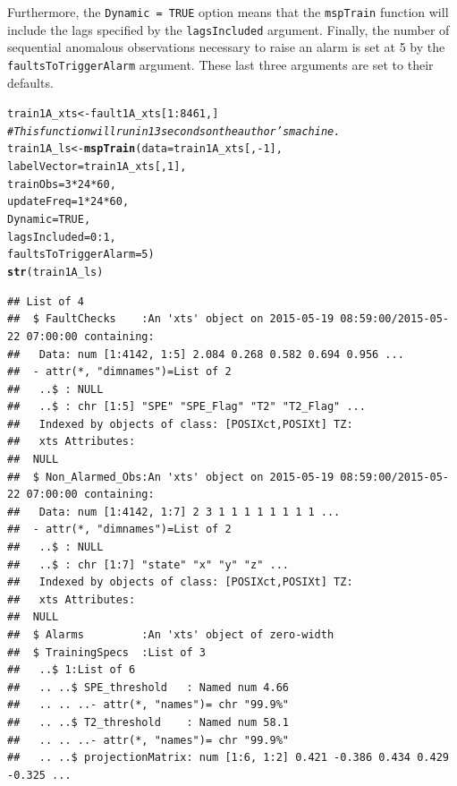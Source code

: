 \documentclass{report}\usepackage[]{graphicx}\usepackage[]{color}
\makeatletter
\newcommand{\hlnum}[1]{\textcolor[rgb]{0.686,0.059,0.569}{#1}}%
\newcommand{\hlcom}[1]{\textcolor[rgb]{0.678,0.584,0.686}{\textit{#1}}}%
\newcommand{\hlopt}[1]{\textcolor[rgb]{0,0,0}{#1}}%
\newcommand{\hlstd}[1]{\textcolor[rgb]{0.345,0.345,0.345}{#1}}%
\newcommand{\hlkwb}[1]{\textcolor[rgb]{0.69,0.353,0.396}{#1}}%
\newcommand{\hlkwc}[1]{\textcolor[rgb]{0.333,0.667,0.333}{#1}}%
\newcommand{\hlkwd}[1]{\textcolor[rgb]{0.737,0.353,0.396}{\textbf{#1}}}%
\newenvironment{kframe}{%
 \def\at@end@of@kframe{}%
 \ifinner\ifhmode%
  \def\at@end@of@kframe{\end{minipage}}%
  \begin{minipage}{\columnwidth}%
 \fi\fi%
 \def\FrameCommand##1{\hskip\@totalleftmargin \hskip-\fboxsep
 \colorbox{shadecolor}{##1}\hskip-\fboxsep
     \hskip-\linewidth \hskip-\@totalleftmargin \hskip\columnwidth}%
 \MakeFramed {\advance\hsize-\width
   \@totalleftmargin\z@ \linewidth\hsize
   \@setminipage}}%
 {\par\unskip\endMakeFramed%
 \at@end@of@kframe}
\newenvironment{knitrout}{}{} %
\makeatother
\begin{document}
Furthermore, the \texttt{Dynamic = TRUE} option means that the \texttt{mspTrain} function will include the lags specified by the \texttt{lagsIncluded} argument. Finally, the number of sequential anomalous observations necessary to raise an alarm is set at 5 by the \texttt{faultsToTriggerAlarm} argument. These last three arguments are set to their defaults.
\begin{knitrout}
\color{fgcolor}\begin{kframe}
\begin{alltt}
\hlstd{train1A_xts} \hlkwb{<-} \hlstd{fault1A_xts[}\hlnum{1}\hlopt{:}\hlnum{8461}\hlstd{,]}
\hlcom{# This function will run in 13 seconds on the author's machine.}
\hlstd{train1A_ls} \hlkwb{<-} \hlkwd{mspTrain}\hlstd{(}\hlkwc{data} \hlstd{= train1A_xts[,}\hlopt{-}\hlnum{1}\hlstd{],}
                       \hlkwc{labelVector} \hlstd{= train1A_xts[,}\hlnum{1}\hlstd{],}
                       \hlkwc{trainObs} \hlstd{=} \hlnum{3} \hlopt{*} \hlnum{24} \hlopt{*} \hlnum{60}\hlstd{,}
                       \hlkwc{updateFreq} \hlstd{=} \hlnum{1} \hlopt{*} \hlnum{24} \hlopt{*} \hlnum{60}\hlstd{,}
                       \hlkwc{Dynamic} \hlstd{=} \hlnum{TRUE}\hlstd{,}
                       \hlkwc{lagsIncluded} \hlstd{=} \hlnum{0}\hlopt{:}\hlnum{1}\hlstd{,}
                       \hlkwc{faultsToTriggerAlarm} \hlstd{=} \hlnum{5}\hlstd{)}
\hlkwd{str}\hlstd{(train1A_ls)}
\end{alltt}
\begin{verbatim}
## List of 4
##  $ FaultChecks    :An 'xts' object on 2015-05-19 08:59:00/2015-05-22 07:00:00 containing:
##   Data: num [1:4142, 1:5] 2.084 0.268 0.582 0.694 0.956 ...
##  - attr(*, "dimnames")=List of 2
##   ..$ : NULL
##   ..$ : chr [1:5] "SPE" "SPE_Flag" "T2" "T2_Flag" ...
##   Indexed by objects of class: [POSIXct,POSIXt] TZ:
##   xts Attributes:
##  NULL
##  $ Non_Alarmed_Obs:An 'xts' object on 2015-05-19 08:59:00/2015-05-22 07:00:00 containing:
##   Data: num [1:4142, 1:7] 2 3 1 1 1 1 1 1 1 1 ...
##  - attr(*, "dimnames")=List of 2
##   ..$ : NULL
##   ..$ : chr [1:7] "state" "x" "y" "z" ...
##   Indexed by objects of class: [POSIXct,POSIXt] TZ:
##   xts Attributes:
##  NULL
##  $ Alarms         :An 'xts' object of zero-width
##  $ TrainingSpecs  :List of 3
##   ..$ 1:List of 6
##   .. ..$ SPE_threshold   : Named num 4.66
##   .. .. ..- attr(*, "names")= chr "99.9%"
##   .. ..$ T2_threshold    : Named num 58.1
##   .. .. ..- attr(*, "names")= chr "99.9%"
##   .. ..$ projectionMatrix: num [1:6, 1:2] 0.421 -0.386 0.434 0.429 -0.325 ...

\end{verbatim}
\end{kframe}
\end{knitrout}
\end{document}
